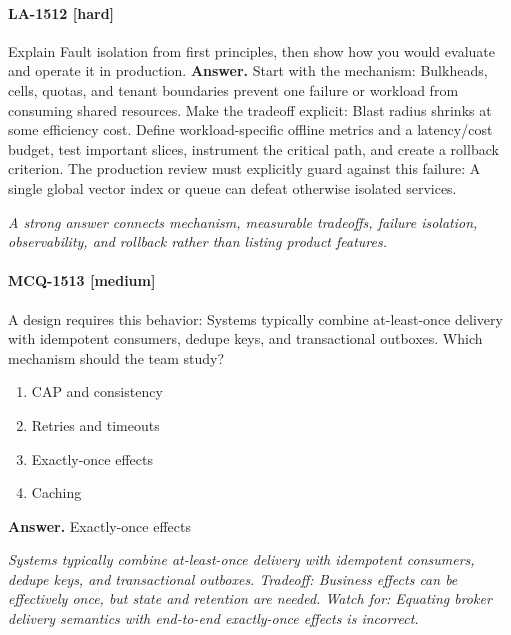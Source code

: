 \paragraph{LA-1512 [hard]} Explain Fault isolation from first principles, then show how you would evaluate and operate it in production.
\noindent\textbf{Answer.} Start with the mechanism: Bulkheads, cells, quotas, and tenant boundaries prevent one failure or workload from consuming shared resources. Make the tradeoff explicit: Blast radius shrinks at some efficiency cost. Define workload-specific offline metrics and a latency/cost budget, test important slices, instrument the critical path, and create a rollback criterion. The production review must explicitly guard against this failure: A single global vector index or queue can defeat otherwise isolated services.
\par\textit{A strong answer connects mechanism, measurable tradeoffs, failure isolation, observability, and rollback rather than listing product features.}
\paragraph{MCQ-1513 [medium]} A design requires this behavior: Systems typically combine at-least-once delivery with idempotent consumers, dedupe keys, and transactional outboxes. Which mechanism should the team study?
\begin{enumerate}[label=\Alph*.]
\item CAP and consistency
\item Retries and timeouts
\item Exactly-once effects
\item Caching
\end{enumerate}
\noindent\textbf{Answer.} Exactly-once effects
\par\textit{Systems typically combine at-least-once delivery with idempotent consumers, dedupe keys, and transactional outboxes. Tradeoff: Business effects can be effectively once, but state and retention are needed. Watch for: Equating broker delivery semantics with end-to-end exactly-once effects is incorrect.}
